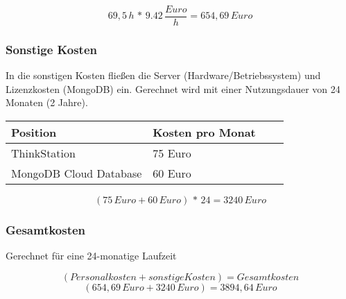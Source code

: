 	\[ 69,5\,h\,*\,9.42\,\frac{Euro}{h} = 654,69\,Euro \]

	\newpage

	\subsubsection{Sonstige Kosten}
	In die sonstigen Kosten fließen die Server (Hardware/Betriebssystem) und Lizenzkosten (MongoDB) ein. Gerechnet wird mit einer Nutzungsdauer von 24 Monaten (2 Jahre).\\

	\begin{table}[htp]

		\begin{center}
			\begin{tabular}{llll} \toprule
				Position & Kosten pro Monat \\ \bottomrule
				ThinkStation & 75 Euro \\
				MongoDB Cloud Database & 60 Euro \\ \bottomrule
			\end{tabular}
		\end{center}
	\end{table}
	
	\[ (75\,Euro + 60\,Euro)\,*\,24 = 3240\,Euro \]

	\subsubsection{Gesamtkosten}
	Gerechnet für eine 24-monatige Laufzeit
		
	\[ (Personalkosten + sonstige Kosten) = Gesamtkosten \]
	\[ (654,69\,Euro + 3240\,Euro) = 3894,64\,Euro \]


